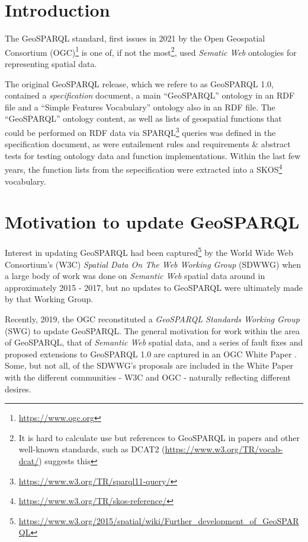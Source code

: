\documentclass[runningheads]{llncs}
\begin{document}
\section{Introduction}\label{sec:introduction}
The GeoSPARQL standard, first issues in 2021 by the Open Geospatial Consortium (OGC)\footnote{\url{https://www.ogc.org}} 
is one of, if not the most\footnote{It is hard to calculate use but references to GeoSPARQL in papers and other 
well-known standards, such as DCAT2 (\url{https://www.w3.org/TR/vocab-dcat/}) suggests this}, used 
\textit{Sematic Web} ontologies for representing spatial data.

The original GeoSPARQL release, which we refere to as GeoSPARQL 1.0, contained a \textit{specification} document,
a main ``GeoSPARQL'' ontology in an RDF file and a ``Simple Features Vocabulary'' ontology also in an RDF file. The 
``GeoSPARQL'' ontology content, as well as lists of geospatial functions that could be performed on RDF data via 
SPARQL\footnote{\url{https://www.w3.org/TR/sparql11-query/}} queries was defined in the specification document, as
were entailement rules and requirements \& abstract tests for testing ontology data and function implementations. 
Within the last few years, the function lists from the sepecification were extracted into a SKOS\footnote{\url{https://www.w3.org/TR/skos-reference/}}
vocabulary.


\section{Motivation to update GeoSPARQL}\label{sec:motivation}
Interest in updating GeoSPARQL had been captured\footnote{\href{https://www.w3.org/2015/spatial/wiki/Further_development_of_GeoSPARQL}{https://www.w3.org/2015/spatial/wiki/Further\_development\_of\_GeoSPARQL}}
 by the World Wide Web Consortium's (W3C) \textit{Spatial Data On The Web Working Group} (SDWWG)
when a large body of work was done on \textit{Semantic Web} spatial data around in approximately 2015 - 2017, but 
no updates to GeoSPARQL were ultimately made by that Working Group.


Recently, 2019, the OGC reconstituted a \textit{GeoSPARQL Standards Working Group} (SWG) to update GeoSPARQL. The general 
motivation for work within the area of GeoSPARQL, that of \textit{Semantic Web} spatial data, and a series of
fault fixes and proposed extensions to GeoSPARQL 1.0 are captured in an OGC White Paper \cite{geosparqlwhitepaper}. Some,
but not all, of the SDWWG's proposals are included in the White Paper with the different communities - W3C and OGC - 
naturally reflecting different desires.
\end{document}
